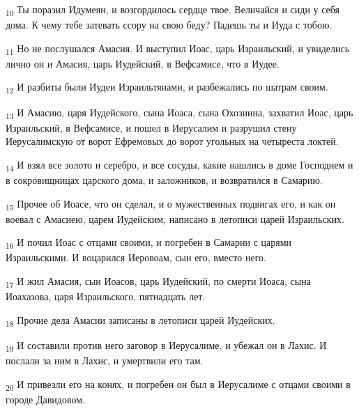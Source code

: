 \begin{tcolorbox}
\textsubscript{10} Ты поразил Идумеян, и возгордилось сердце твое. Величайся и сиди у себя дома. К чему тебе затевать ссору на свою беду? Падешь ты и Иуда с тобою.
\end{tcolorbox}
\begin{tcolorbox}
\textsubscript{11} Но не послушался Амасия. И выступил Иоас, царь Израильский, и увиделись лично он и Амасия, царь Иудейский, в Вефсамисе, что в Иудее.
\end{tcolorbox}
\begin{tcolorbox}
\textsubscript{12} И разбиты были Иудеи Израильтянами, и разбежались по шатрам своим.
\end{tcolorbox}
\begin{tcolorbox}
\textsubscript{13} И Амасию, царя Иудейского, сына Иоаса, сына Охозиина, захватил Иоас, царь Израильский, в Вефсамисе, и пошел в Иерусалим и разрушил стену Иерусалимскую от ворот Ефремовых до ворот угольных на четыреста локтей.
\end{tcolorbox}
\begin{tcolorbox}
\textsubscript{14} И взял все золото и серебро, и все сосуды, какие нашлись в доме Господнем и в сокровищницах царского дома, и заложников, и возвратился в Самарию.
\end{tcolorbox}
\begin{tcolorbox}
\textsubscript{15} Прочее об Иоасе, что он сделал, и о мужественных подвигах его, и как он воевал с Амасиею, царем Иудейским, написано в летописи царей Израильских.
\end{tcolorbox}
\begin{tcolorbox}
\textsubscript{16} И почил Иоас с отцами своими, и погребен в Самарии с царями Израильскими. И воцарился Иеровоам, сын его, вместо него.
\end{tcolorbox}
\begin{tcolorbox}
\textsubscript{17} И жил Амасия, сын Иоасов, царь Иудейский, по смерти Иоаса, сына Иоахазова, царя Израильского, пятнадцать лет.
\end{tcolorbox}
\begin{tcolorbox}
\textsubscript{18} Прочие дела Амасии записаны в летописи царей Иудейских.
\end{tcolorbox}
\begin{tcolorbox}
\textsubscript{19} И составили против него заговор в Иерусалиме, и убежал он в Лахис. И послали за ним в Лахис, и умертвили его там.
\end{tcolorbox}
\begin{tcolorbox}
\textsubscript{20} И привезли его на конях, и погребен он был в Иерусалиме с отцами своими в городе Давидовом.
\end{tcolorbox}
